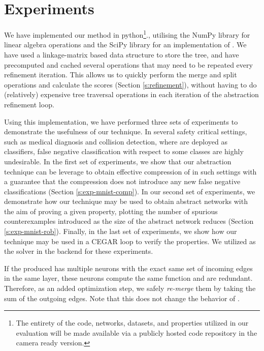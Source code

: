 \section{Experiments} 

We have implemented our method in python\footnote{The entirety of the code,
    networks, datasets, and properties utilized in our evaluation will be made
    available via a publicly hosted code repository in the
camera ready version.}., utilising the NumPy
library for linear algebra operations and the SciPy
library for an
implementation of \hcluster.
We have used a linkage-matrix \cite{scipy-hcluster-linkage}  based
data structure to store the tree, and have precomputed and cached several
operations that may need to be repeated every refinement iteration. This allows
us to quickly perform the merge and split operations and calculate the
scores (Section \ref{s:refinement}), without having to do (relatively)
expensive tree traversal operations in each iteration of the abstraction
refinement loop. 

Using this implementation, we have performed three sets of experiments to
demonstrate the usefulness of our technique. In several safety critical
settings, such as medical diagnosis and collision detection, where \dnn are
deployed as classifiers, false negative classification with respect to some
classes are highly undesirable. In the first set of experiments, we show that
our abstraction technique can be leverage to obtain effective compression of
\dnn in such settings with a guarantee that the compression does not introduce
any new false negative classifications (Section \ref{s:exp-mnist-comp}). In our
second set of experiments, we demonstrate how our technique may be used to
obtain abstract networks with the aim of proving a given property, plotting the
number of spurious counterexamples introduced as the size of the abstract
network reduces (Section \ref{s:exp-mnist-rob}). Finally, in the last set of
experiments, we show how our technique may be used in a CEGAR loop
\cite{cegar-nn} to verify the \acasxu properties. We utilized \abcrown as the 
solver in the backend for these experiments. 

If the \abs produced has multiple neurons with the exact same set of incoming
edges in the same layer, these neurons compute the same function and are
redundant. Therefore, as an added optimization step, we safely \textit{re-merge}
them by taking the sum of the outgoing edges. Note that this does not change the
behavior of \abs.

